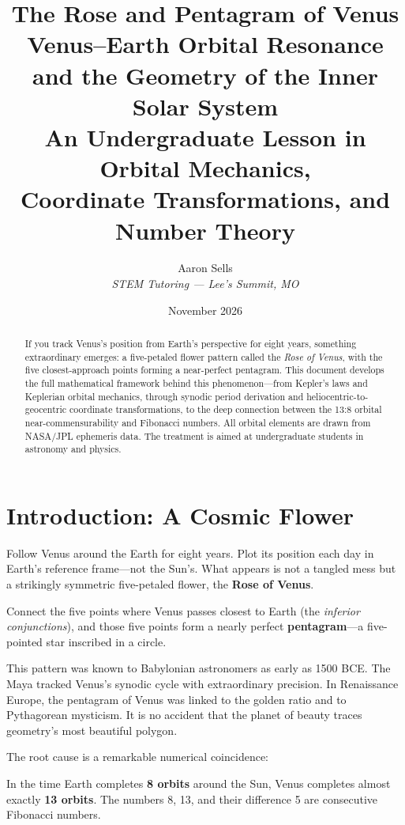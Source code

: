 \documentclass[11pt,letterpaper]{article}
\title{%
  \vspace{-1cm}
  {\Huge\bfseries The Rose and Pentagram of Venus}\\[6pt]
  {\Large Venus–Earth Orbital Resonance\\
   and the Geometry of the Inner Solar System}\\[8pt]
  {\normalsize An Undergraduate Lesson in Orbital Mechanics,\\
   Coordinate Transformations, and Number Theory}
}
\author{%
  Aaron Sells\\
  \textit{STEM Tutoring — Lee's Summit, MO}
}
\date{November 2026}
\theoremstyle{definition}
\theoremstyle{plain}
\theoremstyle{remark}
\begin{document}
\maketitle
\thispagestyle{fancy}

\begin{abstract}
If you track Venus's position from Earth's perspective for eight years,
something extraordinary emerges: a five-petaled flower pattern called the
\textit{Rose of Venus}, with the five closest-approach points forming a
near-perfect pentagram. This document develops the full mathematical
framework behind this phenomenon—from Kepler's laws and Keplerian orbital
mechanics, through synodic period derivation and heliocentric-to-geocentric
coordinate transformations, to the deep connection between the 13:8
orbital near-commensurability and Fibonacci numbers. All orbital elements
are drawn from NASA/JPL ephemeris data. The treatment is aimed at
undergraduate students in astronomy and physics.
\end{abstract}

\tableofcontents
\newpage

\section{Introduction: A Cosmic Flower}
\label{sec:intro}

Follow Venus around the Earth for eight years.
Plot its position each day in Earth's reference frame—not the Sun's.
What appears is not a tangled mess but a strikingly symmetric
five-petaled flower, the \textbf{Rose of Venus}.

Connect the five points where Venus passes closest to Earth
(the \textit{inferior conjunctions}), and those five points form
a nearly perfect \textbf{pentagram}—a five-pointed star inscribed
in a circle.

\begin{historicalnote}
This pattern was known to Babylonian astronomers as early as
1500 BCE. The Maya tracked Venus's synodic cycle with extraordinary
precision. In Renaissance Europe, the pentagram of Venus was
linked to the golden ratio and to Pythagorean mysticism. It is
no accident that the planet of beauty traces geometry's most
beautiful polygon.
\end{historicalnote}

The root cause is a remarkable numerical coincidence:
\begin{keyresult}
In the time Earth completes \textbf{8 orbits} around the Sun,
Venus completes almost exactly \textbf{13 orbits}. The numbers
8, 13, and their difference 5 are consecutive Fibonacci numbers.
\end{keyresult}
\end{document}
